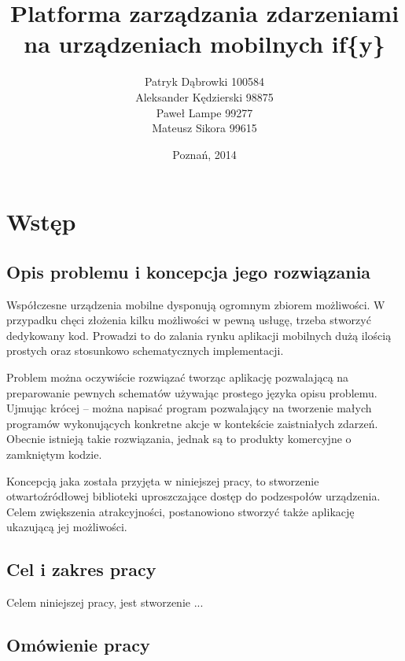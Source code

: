 \documentclass[11pt,a4paper,polish,thesis]{dcsbook}
\begin{document}
\author{Patryk Dąbrowki 100584\\ Aleksander Kędzierski 98875\\ Paweł Lampe 99277\\ Mateusz Sikora 99615}
\title{Platforma zarządzania zdarzeniami na urządzeniach mobilnych if\{y\}}
\date{Poznań, 2014}

\maketitle

\frontmatter

\tableofcontents{}

\mainmatter

\chapter{Wstęp}
\section{Opis problemu i koncepcja jego rozwiązania}
Współczesne urządzenia mobilne dysponują ogromnym zbiorem możliwości. W przypadku chęci złożenia kilku możliwości w pewną usługę, trzeba stworzyć dedykowany kod.
Prowadzi to do zalania rynku aplikacji mobilnych dużą ilością prostych oraz stosunkowo schematycznych implementacji.

Problem można oczywiście rozwiązać tworząc aplikację pozwalającą na preparowanie pewnych schematów używając prostego języka opisu problemu. Ujmując krócej --
można napisać program pozwalający na tworzenie małych programów wykonujących konkretne akcje w kontekście zaistniałych zdarzeń. Obecnie istnieją takie
rozwiązania, jednak są to produkty komercyjne o zamkniętym kodzie.

Koncepcją jaka została przyjęta w niniejszej pracy, to stworzenie otwartoźródłowej biblioteki uproszczające dostęp do podzespołów urządzenia. Celem zwiększenia
atrakcyjności, postanowiono stworzyć także aplikację ukazującą jej możliwości.
\section{Cel i zakres pracy}
Celem niniejszej pracy, jest stworzenie ...
\section{Omówienie pracy}
\end{document}

